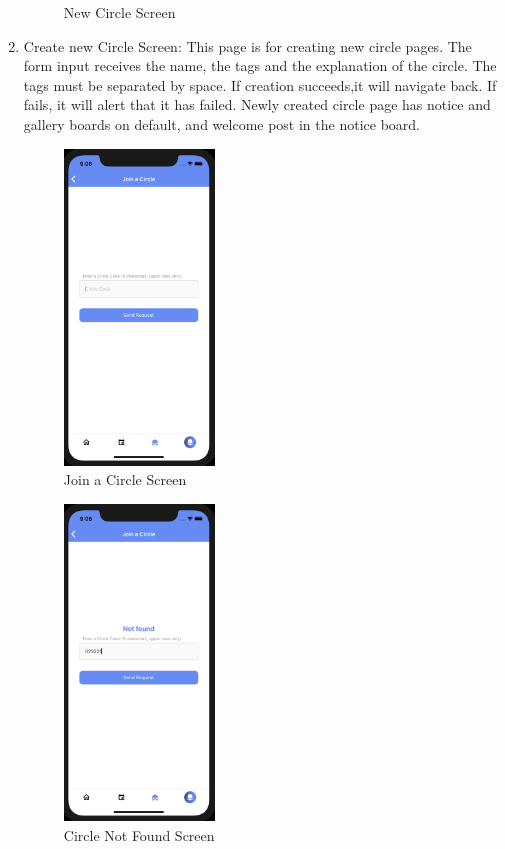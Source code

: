 \documentclass[conference]{IEEEtran}
\begin{document}
\begin{enumerate}
\begin{figure}[h]
        \caption{New Circle Screen}
        \label{fig:my_label}
    \end{figure}
    \item Create new Circle Screen: This page is for creating new circle pages. The form input receives the name, the tags and the explanation of the circle. The tags must be separated by space. If creation succeeds,it will navigate back. If fails, it will alert that it has failed. Newly created circle page has notice and gallery boards on default, and welcome post in the notice board.
    \begin{figure}[h]
        \centering
        \includegraphics[width=4cm]{images/joinacircle1.png}
        \caption{Join a Circle Screen}
        \label{fig:my_label}
    \end{figure}
    \begin{figure}[h]
        \centering
        \includegraphics[width=4cm]{images/joinacircle2.png}
        \caption{Circle Not Found Screen}
        \label{fig:my_label}

\end{figure}
\end{enumerate}
\end{document}
